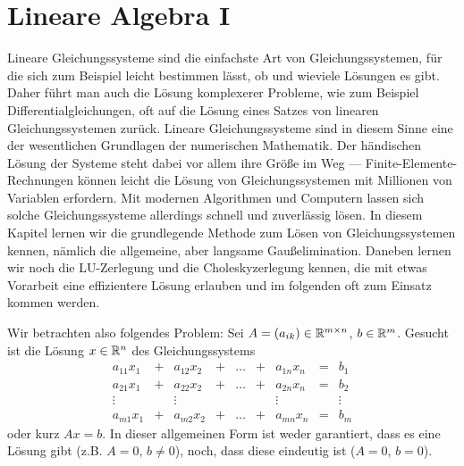 % 
\chapter{Lineare Algebra \textrm{I}}

Lineare Gleichungssysteme sind die einfachste Art von
Gleichungssystemen, für die sich zum Beispiel leicht bestimmen lässt,
ob und wieviele Lösungen es gibt. Daher führt man auch die Lösung
komplexerer Probleme, wie zum Beispiel Differentialgleichungen, oft
auf die Lösung eines Satzes von linearen Gleichungssystemen
zurück. Lineare Gleichungssysteme sind in diesem Sinne eine der
wesentlichen Grundlagen der numerischen Mathematik. Der händischen
Lösung der Systeme steht dabei vor allem ihre Größe im Weg ---
Finite-Elemente-Rechnungen können leicht die Lösung von
Gleichungssystemen mit Millionen von Variablen erfordern. Mit modernen
Algorithmen und Computern lassen sich solche Gleichungssysteme
allerdings schnell und zuverlässig lösen. In diesem Kapitel lernen wir
die grundlegende Methode zum Lösen von Gleichungssystemen kennen,
nämlich die allgemeine, aber langsame Gaußelimination. Daneben lernen
wir noch die LU-Zerlegung und die Choleskyzerlegung kennen, die mit
etwas Vorarbeit eine effizientere Lösung erlauben und im folgenden oft
zum Einsatz kommen werden.

Wir betrachten also folgendes Problem: Sei $A=(a_{ik})\in\mathbb{R}^{m\times
  n}$, $b\in\mathbb{R}^m$. Gesucht ist die Lösung $x\in\mathbb{R}^n$ des
Gleichungssystems
\begin{equation}
  \label{eq:lgs}
  \begin{matrix}
    a_{11}x_1 &+&  a_{12}x_2 &+& \ldots &+& a_{1n}x_n &=& b_1\\
    a_{21}x_1 &+&  a_{22}x_2 &+& \ldots &+& a_{2n}x_n &=& b_2\\
    \vdots   &&   \vdots   &&         && \vdots  && \vdots\\
    a_{m1}x_1 &+&  a_{m2}x_2 &+& \ldots &+& a_{mn}x_n &=& b_m
  \end{matrix}
\end{equation}
oder kurz $Ax=b$. In dieser allgemeinen Form ist weder garantiert,
dass es eine Lösung gibt (z.B. $A=0$, $b\neq 0$), noch, dass diese
eindeutig ist ($A=0$, $b=0$).

